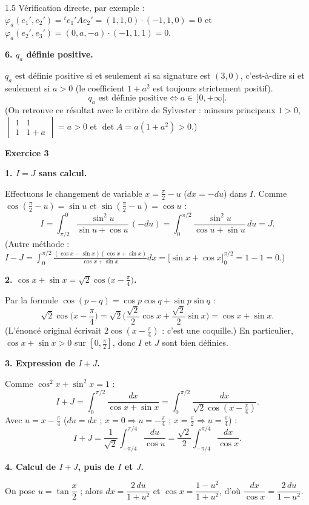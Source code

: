 \documentclass[12pt]{article}
\begin{document}
\begin{spacing}{1.5}
Vérification directe, par exemple : $\varphi_a(e_1',e_2')={}^te_1'Ae_2'=(1,1,0)\cdot(-1,1,0)=0$ et $\varphi_a(e_2',e_3')=(0,a,-a)\cdot(-1,1,1)=0$.

\textbf{6. $q_a$ définie positive.}

$q_a$ est définie positive si et seulement si sa signature est $(3,0)$, c'est-à-dire si et seulement si $a>0$ (le coefficient $1+a^2$ est toujours strictement positif).
\[
\boxed{q_a \text{ est définie positive} \iff a\in\,]0,+\infty[}.
\]
(On retrouve ce résultat avec le critère de Sylvester : mineurs principaux $1>0$, $\begin{vmatrix}1&1\\1&1+a\end{vmatrix}=a>0$ et $\det A=a(1+a^2)>0$.)

\medskip\textbf{Exercice 3}

\textbf{1. $I=J$ sans calcul.}

Effectuons le changement de variable $x=\frac\pi2-u$ ($dx=-du$) dans $I$. Comme $\cos(\frac\pi2-u)=\sin u$ et $\sin(\frac\pi2-u)=\cos u$ :
\[
I=\int_{\pi/2}^{0}\frac{\sin^2u}{\sin u+\cos u}\,(-du)=\int_0^{\pi/2}\frac{\sin^2u}{\cos u+\sin u}\,du=J .
\]
(Autre méthode : $I-J=\displaystyle\int_0^{\pi/2}\frac{(\cos x-\sin x)(\cos x+\sin x)}{\cos x+\sin x}dx=\big[\sin x+\cos x\big]_0^{\pi/2}=1-1=0$.)

\textbf{2. $\cos x+\sin x=\sqrt2\cos\big(x-\frac\pi4\big)$.}

Par la formule $\cos(p-q)=\cos p\cos q+\sin p\sin q$ :
\[
\sqrt2\cos\Big(x-\frac\pi4\Big)=\sqrt2\Big(\frac{\sqrt2}{2}\cos x+\frac{\sqrt2}{2}\sin x\Big)=\cos x+\sin x .
\]
(L'énoncé original écrivait $2\cos(x-\frac\pi4)$ : c'est une coquille.) En particulier, $\cos x+\sin x>0$ sur $[0,\frac\pi2]$, donc $I$ et $J$ sont bien définies.

\textbf{3. Expression de $I+J$.}

Comme $\cos^2x+\sin^2x=1$ :
\[
I+J=\int_0^{\pi/2}\frac{dx}{\cos x+\sin x}=\int_0^{\pi/2}\frac{dx}{\sqrt2\cos(x-\frac\pi4)} .
\]
Avec $u=x-\frac\pi4$ ($du=dx$ ; $x=0\Rightarrow u=-\frac\pi4$ ; $x=\frac\pi2\Rightarrow u=\frac\pi4$) :
\[
I+J=\frac1{\sqrt2}\int_{-\pi/4}^{\pi/4}\frac{du}{\cos u}=\frac{\sqrt2}{2}\int_{-\pi/4}^{\pi/4}\frac{dx}{\cos x}.
\]

\textbf{4. Calcul de $I+J$, puis de $I$ et $J$.}

On pose $u=\tan\dfrac x2$ ; alors $dx=\dfrac{2\,du}{1+u^2}$ et $\cos x=\dfrac{1-u^2}{1+u^2}$, d'où $\dfrac{dx}{\cos x}=\dfrac{2\,du}{1-u^2}$.


\end{spacing}
\end{document}
